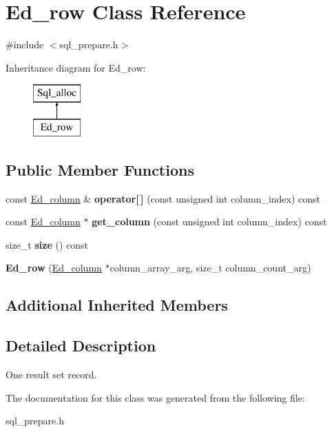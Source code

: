 \hypertarget{classEd__row}{}\section{Ed\+\_\+row Class Reference}
\label{classEd__row}


{\ttfamily \#include $<$sql\+\_\+prepare.\+h$>$}

Inheritance diagram for Ed\+\_\+row\+:\begin{figure}[H]
\begin{center}
\leavevmode
\includegraphics[height=2.000000cm]{classEd__row}
\end{center}
\end{figure}
\subsection*{Public Member Functions}
\begin{DoxyCompactItemize}
\item 
\mbox{\label{classEd__row_ab490a3a65fe155da7ac944acc280db17}} 
const \mbox{\hyperlink{structEd__column}{Ed\+\_\+column}} \& {\bfseries operator\mbox{[}$\,$\mbox{]}} (const unsigned int column\+\_\+index) const
\item 
\mbox{\label{classEd__row_afe7990e423c1c6025ad111c70360bf42}} 
const \mbox{\hyperlink{structEd__column}{Ed\+\_\+column}} $\ast$ {\bfseries get\+\_\+column} (const unsigned int column\+\_\+index) const
\item 
\mbox{\label{classEd__row_a8167782f56d40945cef6f1f928177dbf}} 
size\+\_\+t {\bfseries size} () const
\item 
\mbox{\label{classEd__row_a623df1476187c288786be49fb29a1dea}} 
{\bfseries Ed\+\_\+row} (\mbox{\hyperlink{structEd__column}{Ed\+\_\+column}} $\ast$column\+\_\+array\+\_\+arg, size\+\_\+t column\+\_\+count\+\_\+arg)
\end{DoxyCompactItemize}
\subsection*{Additional Inherited Members}


\subsection{Detailed Description}
One result set record. 

The documentation for this class was generated from the following file\+:\begin{DoxyCompactItemize}
\item 
sql\+\_\+prepare.\+h\end{DoxyCompactItemize}

